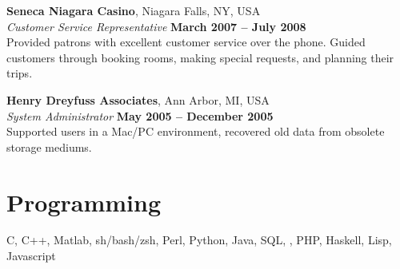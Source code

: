 \documentclass[margin,line]{resume}
\begin{document}
\begin{resume}
\textbf{Seneca Niagara Casino}, Niagara Falls, NY, USA \vspace{2mm}\\
\textsl{Customer Service Representative} \hfill \textbf{March 2007 -- July 2008} \vspace{1mm}\\
Provided patrons with excellent customer service over the phone. Guided
customers through booking rooms, making special requests, and planning their
trips.

\textbf{Henry Dreyfuss Associates}, Ann Arbor, MI, USA \vspace{2mm}\\
\textsl{System Administrator} \hfill \textbf{May 2005 -- December 2005}\vspace{1mm}\\
Supported users in a Mac/PC environment, recovered old data from obsolete
storage mediums.

\section{\mysidestyle Programming}
C, C++, Matlab, sh/bash/zsh, Perl, Python, Java, SQL, \LaTeXe, PHP, Haskell,
Lisp, Javascript

\end{resume}
\end{document}
